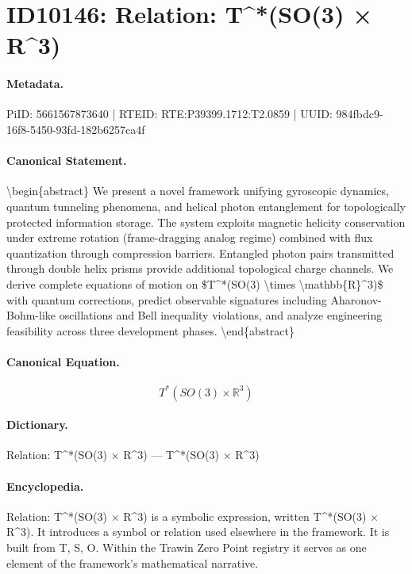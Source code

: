 \section*{ID10146: Relation: T\textasciicircum{}*(SO(3) × R\textasciicircum{}3)}
\paragraph{Metadata.}
PiID: 5661567873640 | RTEID: RTE:P39399.1712:T2.0859 | UUID: 984fbdc9-16f8-5450-93fd-182b6257ca4f

\paragraph{Canonical Statement.}
\textbackslash{}begin\{abstract\} We present a novel framework unifying gyroscopic dynamics, quantum tunneling phenomena, and helical photon entanglement for topologically protected information storage. The system exploits magnetic helicity conservation under extreme rotation (frame-dragging analog regime) combined with flux quantization through compression barriers. Entangled photon pairs transmitted through double helix prisms provide additional topological charge channels. We derive complete equations of motion on \$T\textasciicircum{}*(SO(3) \textbackslash{}times \textbackslash{}mathbb\{R\}\textasciicircum{}3)\$ with quantum corrections, predict observable signatures including Aharonov-Bohm-like oscillations and Bell inequality violations, and analyze engineering feasibility across three development phases. \textbackslash{}end\{abstract\}

\paragraph{Canonical Equation.}
\[
T^*(SO(3) \times \mathbb{R}^3)
\]

\paragraph{Dictionary.}
Relation: T\textasciicircum{}*(SO(3) × R\textasciicircum{}3) — T\textasciicircum{}*(SO(3) × R\textasciicircum{}3)

\paragraph{Encyclopedia.}
Relation: T\textasciicircum{}*(SO(3) × R\textasciicircum{}3) is a symbolic expression, written T\textasciicircum{}*(SO(3) × R\textasciicircum{}3). It introduces a symbol or relation used elsewhere in the framework. It is built from T, S, O. Within the Trawin Zero Point registry it serves as one element of the framework's mathematical narrative.
